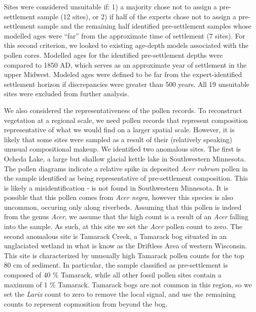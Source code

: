 \documentclass[12pt]{article}
\begin{document}

Sites were considered unsuitable if: 1) a majority chose not to assign
a pre-settlement sample (12 sites), or 2) if half of the experts chose
not to assign a pre-settlement sample and the remaining half
identified pre-settlement samples whose modelled ages were “far” from
the approximate time of settlement (7 sites). For this second
criterion, we looked to existing age-depth models associated with the
pollen cores. Modelled ages for the identified pre-settlement depths
were compared to 1850 AD, which serves as an approximate year of
settlement in the upper Midwest.  Modeled ages were defined to be far
from the expert-identified settlement horizon if discrepancies were
greater than 500 years. All 19 unsuitable sites were excluded from further
analysis.

We also considered the representativeness of the pollen records. To
reconstruct vegetation at a regional scale, we need pollen records
that represent composition representative of what we would find on a
larger spatial scale. However, it is likely that some sites were
sampled as a result of their (relatively speaking) unusual
compositional makeup. We identified two anomalous sites. The first is
Ocheda Lake, a large but shallow glacial kettle lake in Southwestern
Minnesota. The pollen diagrams indicate a relative spike in deposited
\textit{Acer rubrum} pollen in the sample identified as being
representative of pre-settlement composition. This is likely a
misidentification -  is not found in Southwestern
Minnesota. It is possible that this pollen comes from \textit{Acer
  negra}, however this species is also uncommon, occuring only along
riverbeds. Assuming that this pollen is indeed from the genus
\textit{Acer}, we assume that the high count is a result of an
\textit{Acer} falling into the sample. As such, at this site we set
the \textit{Acer} pollen count to zero. The second anomalous site is
Tamarack Creek, a Tamarack bog situated in an unglaciated wetland in
what is know as the Driftless Area of western Wisconsin. This site is
characterized by unusually high Tamarack pollen counts for the top 80
cm of sediment. In particular, the sample classified as pre-settlement
is composed of 40 \% Tamarack, while all other fossil pollen sites
contain a maximum of 1 \% Tamarack. Tamarack bogs are not common in
this region, so we set the \textit{Larix} count to zero to remove the
local signal, and use the remaining counts to represent copmosition
from beyond the bog.
\end{document}
